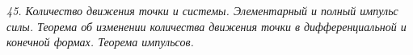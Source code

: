 \emph{45. Количество движения точки и системы. Элементарный и полный импульс
силы. Теорема об изменении количества движения точки в дифференциальной и
конечной формах. Теорема импульсов.}

\newpage
